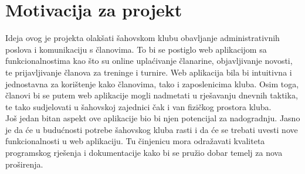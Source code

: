 		\section{Motivacija za projekt}
		Ideja ovog je projekta olakšati šahovskom klubu obavljanje administrativnih poslova i komunikaciju s članovima. To bi se postiglo web aplikacijom sa funkcionalnostima kao što su online uplaćivanje članarine, objavljivanje novosti, te prijavljivanje članova za treninge i turnire. Web aplikacija bila bi intuitivna i jednostavna za korištenje kako članovima, tako i zaposlenicima kluba. Osim toga, članovi bi se putem web aplikacije mogli nadmetati u rješavanju dnevnih taktika, te tako sudjelovati u šahovskoj zajednici čak i van fizičkog prostora kluba.  \\
Još jedan bitan aspekt ove aplikacije bio bi njen potencijal za nadogradnju. Jasno je da će u budućnosti potrebe šahovskog kluba rasti i da će se trebati uvesti nove funkcionalnosti u web aplikaciju. Tu činjenicu mora odražavati kvaliteta programskog rješenja i dokumentacije kako bi se pružio dobar temelj za nova proširenja.
		
		\eject

		
	
